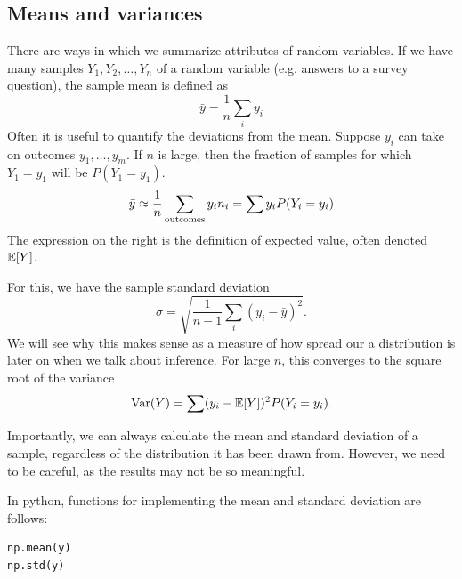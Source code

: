 \subsection{Means and variances}
There are ways in which we summarize attributes of random variables.
If we have many samples $Y_1,Y_2,\dots,Y_n$ of a random variable (e.g. answers to a survey question), the {\dfn sample mean} is defined as
\begin{equation}
\bar{y} = \frac{1}{n}\sum_{i}y_i
\end{equation}
 Often it is useful to quantify the deviations from the mean. Suppose $y_i$ can take on outcomes $y_1,\dots,y_m$. If $n$ is large, then the fraction of samples for which $Y_1= y_1$ will be $P(Y_1=y_1)$.
 \begin{equation}
\bar{y} \approx \frac{1}{n} \sum_{\rm outcomes} y_in_i= \sum y_i P(Y_i=y_i)
\end{equation}
The expression on the right is the definition of expected value, often denoted $\mathbb E[Y]$.



 For this, we have the {\dfn sample standard deviation}
\begin{equation}
\sigma = \sqrt{\frac{1}{n-1}\sum_{i}(y_i-\bar{y})^2}.
\end{equation}
We will see why this makes sense as a measure of how spread our a distribution is later on when we talk about inference. For large $n$, this converges to the square root of the variance
\begin{equation}
{\rm Var}(Y) = \sum (y_i - \mathbb E[Y])^2 P(Y_i=y_i).
\end{equation}



Importantly, we can always calculate the mean and standard deviation of a sample, regardless of the distribution it has been drawn from. However, we need to be careful, as the results may not be so meaningful.




In python, functions for implementing the mean and standard deviation are follows:
\begin{Verbatim}
np.mean(y)
np.std(y)
\end{Verbatim}

%


